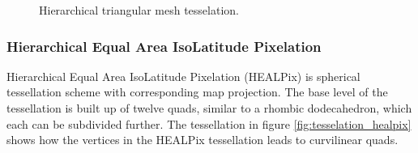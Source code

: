 \begin{figure}
\begin{subfigure}[b]{0.2\textwidth}
    \end{subfigure}
    \caption{Hierarchical triangular mesh tesselation.}
    \label{fig:tesselation_htm}
\end{figure}

\subsubsection{Hierarchical Equal Area IsoLatitude Pixelation}

Hierarchical Equal Area IsoLatitude Pixelation (HEALPix) is spherical tessellation scheme with corresponding map projection. The base level of the tessellation is built up of twelve quads, similar to a rhombic dodecahedron, which each can be subdivided further. The tessellation in figure \ref{fig:tesselation_healpix} shows how the vertices in the HEALPix tessellation leads to curvilinear quads.

